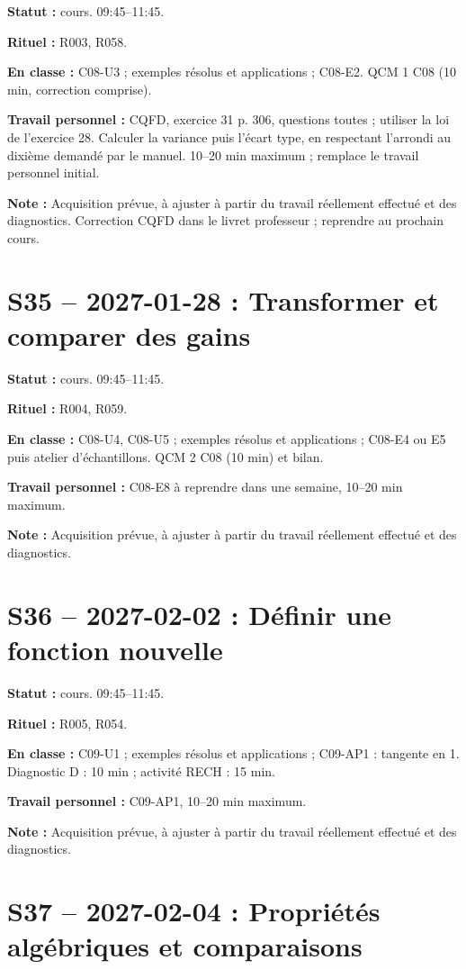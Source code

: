 \textbf{Statut :} cours. 09:45–11:45.\par\textbf{Rituel :} R003, R058.\par\textbf{En classe :} C08-U3 ; exemples résolus et applications ; C08-E2.  QCM 1 C08 (10 min, correction comprise).\par\textbf{Travail personnel :} CQFD, exercice 31 p. 306, questions toutes ; utiliser la loi de l’exercice 28. Calculer la variance puis l’écart type, en respectant l’arrondi au dixième demandé par le manuel. 10–20 min maximum ; remplace le travail personnel initial.\par\textbf{Note :} Acquisition prévue, à ajuster à partir du travail réellement effectué et des diagnostics. Correction CQFD dans le livret professeur ; reprendre au prochain cours.
\section*{S35 -- 2027-01-28 : Transformer et comparer des gains}
\textbf{Statut :} cours. 09:45–11:45.\par\textbf{Rituel :} R004, R059.\par\textbf{En classe :} C08-U4, C08-U5 ; exemples résolus et applications ; C08-E4 ou E5 puis atelier d’échantillons.  QCM 2 C08 (10 min) et bilan.\par\textbf{Travail personnel :} C08-E8 à reprendre dans une semaine, 10–20 min maximum.\par\textbf{Note :} Acquisition prévue, à ajuster à partir du travail réellement effectué et des diagnostics.
\section*{S36 -- 2027-02-02 : Définir une fonction nouvelle}
\textbf{Statut :} cours. 09:45–11:45.\par\textbf{Rituel :} R005, R054.\par\textbf{En classe :} C09-U1 ; exemples résolus et applications ; C09-AP1 : tangente en 1. Diagnostic D : 10 min ; activité RECH : 15 min.\par\textbf{Travail personnel :} C09-AP1, 10–20 min maximum.\par\textbf{Note :} Acquisition prévue, à ajuster à partir du travail réellement effectué et des diagnostics.
\section*{S37 -- 2027-02-04 : Propriétés algébriques et comparaisons}
